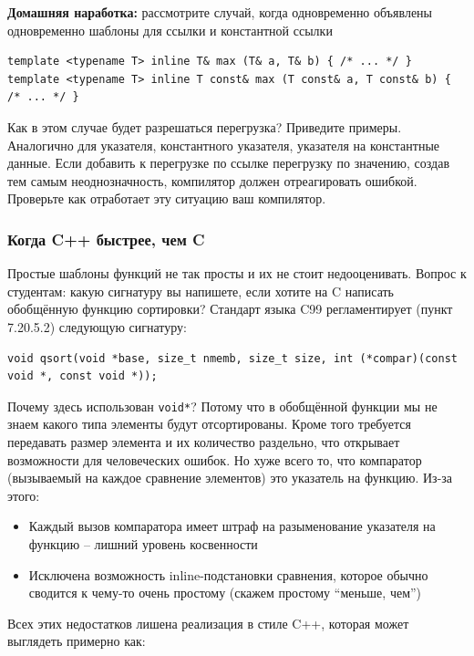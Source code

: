 \documentclass[a4paper,12pt,oneside]{article}
\begin{document}
\textbf{Домашняя наработка:} рассмотрите случай, когда одновременно объявлены одновременно шаблоны для ссылки и константной ссылки

\begin{lstlisting}
template <typename T> inline T& max (T& a, T& b) { /* ... */ }
template <typename T> inline T const& max (T const& a, T const& b) { /* ... */ }
\end{lstlisting}

Как в этом случае будет разрешаться перегрузка? Приведите примеры. Аналогично для указателя, константного указателя, указателя на константные данные. Если добавить к перегрузке по ссылке перегрузку по значению, создав тем самым неоднозначность, компилятор должен отреагировать ошибкой. Проверьте как отработает эту ситуацию ваш компилятор.

\subsubsection{Когда C++ быстрее, чем C}\label{CppBetterC}

Простые шаблоны функций не так просты и их не стоит недооценивать. Вопрос к студентам: какую сигнатуру вы напишете, если хотите на C написать обобщённую функцию сортировки? Стандарт языка C99 регламентирует (пункт 7.20.5.2) следующую сигнатуру:

\begin{lstlisting}
void qsort(void *base, size_t nmemb, size_t size, int (*compar)(const void *, const void *));
\end{lstlisting}

Почему здесь использован \lstinline!void*!? Потому что в обобщённой функции мы не знаем какого типа элементы будут отсортированы. Кроме того требуется передавать размер элемента и их количество раздельно, что открывает возможности для человеческих ошибок. Но хуже всего то, что компаратор (вызываемый на каждое сравнение элементов) это указатель на функцию. Из-за этого:

\begin{itemize}
\item Каждый вызов компаратора имеет штраф на разыменование указателя на функцию -- лишний уровень косвенности
\item Исключена возможность inline-подстановки сравнения, которое обычно сводится к чему-то очень простому (скажем простому ``меньше, чем'')
\end{itemize}

Всех этих недостатков лишена реализация в стиле C++, которая может выглядеть примерно как:
\end{document}
